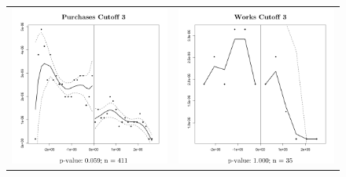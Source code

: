 \documentclass[11pt]{article}
\begin{document}
\begin{figure}[!htbp]
\begin{tabular}{cc}
  \includegraphics[scale=.24]{purchasesmanipulation3} & \includegraphics[scale=.24]{worksmanipulation3} \\
  \end{tabular}
\end{figure}
\end{document}
